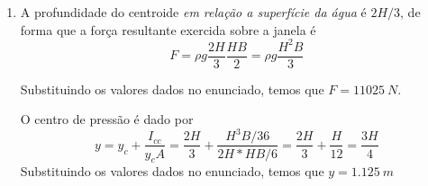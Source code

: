 \documentclass[12pt,a4paper,brazilian, fleqn]{article}
\begin{document}
\begin{enumerate}
    \item A profundidade do centroide \textit{em relação a superfície da água} é
        \(2H/3\), de forma que a força resultante exercida sobre a janela é
        \[
            F=\rho g \frac{2H}{3} \frac{HB}{2} = \rho g \frac{H^2 B}{3}
        \]

        Substituindo os valores dados no enunciado, temos que
        \(F=\SI{11025}{N}\).

        O centro de pressão é dado por
        \[
            y=y_c + \frac{I_{cc}}{y_c A} =
            \frac{2H}{3} + \frac{H^3B/36}{2H*HB/6}=
            \frac{2H}{3} + \frac{H}{12} = \frac{3H}{4}
        \]
        Substituindo os valores dados no enunciado, temos que
        \(y=\SI{1.125}{m}\)

\end{enumerate}
\end{document}
